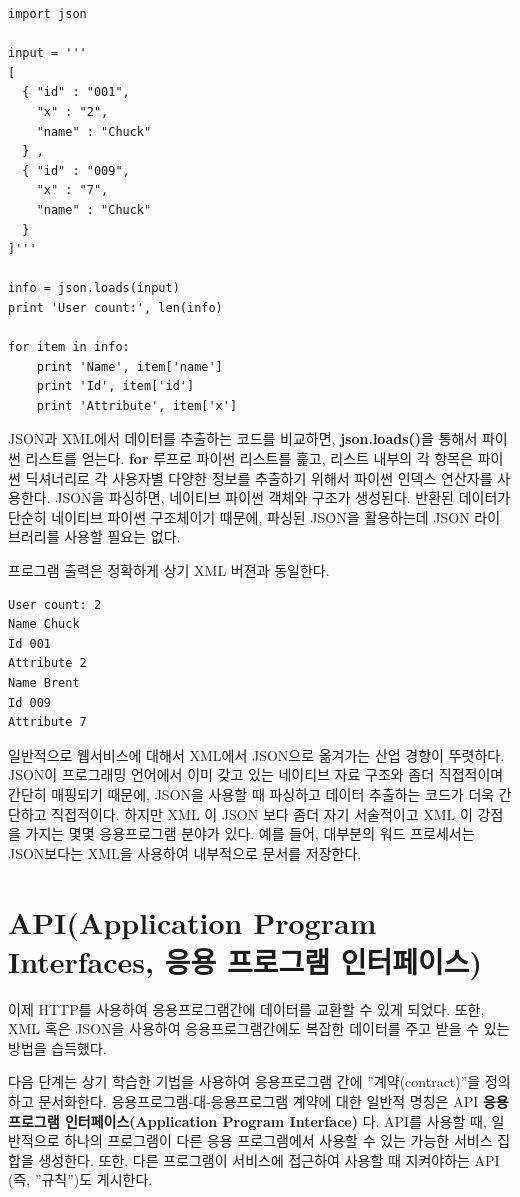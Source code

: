 \beforeverb
\begin{verbatim}
import json

input = '''
[
  { "id" : "001",
    "x" : "2",
    "name" : "Chuck"
  } ,
  { "id" : "009",
    "x" : "7",
    "name" : "Chuck"
  } 
]'''

info = json.loads(input)
print 'User count:', len(info)

for item in info:
    print 'Name', item['name']
    print 'Id', item['id']
    print 'Attribute', item['x']
\end{verbatim}
\afterverb
%

JSON과 XML에서 데이터를 추출하는 코드를 비교하면, {\bf json.loads()}을 통해서 파이썬 리스트를 얻는다.
{\bf for} 루프로 파이썬 리스트를 훑고, 리스트 내부의 각 항목은 파이썬 딕셔너리로 각 사용자별 다양한 정보를 추출하기 위해서 파이썬 인덱스 연산자를 사용한다. 
JSON을 파싱하면, 네이티브 파이썬 객체와 구조가 생성된다.
반환된 데이터가 단순히 네이티브 파이썬 구조체이기 때문에, 파싱된 JSON을 활용하는데 JSON 라이브러리를 사용할 필요는 없다. 
 
프로그램 출력은 정확하게 상기 XML 버젼과 동일한다.

\beforeverb
\begin{verbatim}
User count: 2
Name Chuck
Id 001
Attribute 2
Name Brent
Id 009
Attribute 7
\end{verbatim}
\afterverb
%

일반적으로 웹서비스에 대해서 XML에서 JSON으로 옮겨가는 산업 경향이 뚜렷하다.
JSON이 프로그래밍 언어에서 이미 갖고 있는 네이티브 자료 구조와 좀더 직접적이며 간단히 매핑되기 때문에,
JSON을 사용할 때 파싱하고 데이터 추출하는 코드가 더욱 간단하고 직접적이다.
하지만 XML 이 JSON 보다 좀더 자기 서술적이고 XML 이 강점을 가지는 몇몇 응용프로그램 분야가 있다.
예를 들어, 대부분의 워드 프로세서는 JSON보다는 XML을 사용하여 내부적으로 문서를 저장한다. 

\section{API(Application Program Interfaces, 응용 프로그램 인터페이스)}

이제 HTTP를 사용하여 응용프로그램간에 데이터를 교환할 수 있게 되었다. 
또한, XML 혹은 JSON을 사용하여 응용프로그램간에도 복잡한 데이터를 주고 받을 수 있는 방법을 습득했다.

다음 단계는 상기 학습한 기법을 사용하여 응용프로그램 간에 ''계약(contract)''을 정의하고 문서화한다.
응용프로그램-대-응용프로그램 계약에 대한 일반적 명칭은 API {\bf 응용 프로그램 인터페이스(Application Program Interface)} 다. 
API를 사용할 때, 일반적으로 하나의 프로그램이 다른 응용 프로그램에서 사용할 수 있는 가능한 서비스 집합을 생성한다.
또한, 다른 프로그램이 서비스에 접근하여 사용할 때 지켜야하는 API (즉, ''규칙'')도 게시한다.  

